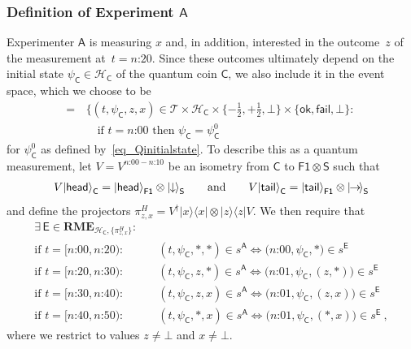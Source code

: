 \documentclass{article}
\theoremstyle{plain}
\theoremstyle{definition}
\newcommand*{\cH}{\mathcal{H}}
\newcommand*{\cT}{\mathcal{T}}
\newcommand*{\ket}[1]{{| #1 \rangle}}
\newcommand{\proj}[1]{|#1\rangle\!\langle #1|}
\newcommand*{\Exp}{\mathsf{E}}
\newcommand*{\Friendone}{\mathsf{F1}}
\newcommand*{\Assistant}{\mathsf{A}}
\newcommand*{\Spin}{\mathsf{S}}
\newcommand*{\Coin}{\mathsf{C}}
\newcommand*{\RME}{\mathbf{RME}}
\newcommand*{\spindown}{\ket{{\hspace{-0.1ex}\downarrow\hspace{-0.1ex}}}}
\newcommand*{\spinright}{\ket{{\hspace{-0.2ex}\rightarrow\hspace{-0.4ex}}}}
\newcommand*{\sminus}{{\textstyle - \frac{1}{2}}}
\newcommand*{\splus}{{\textstyle + \frac{1}{2}}}
\newcommand*{\ok}{\mathsf{ok}}
\newcommand*{\fail}{\mathsf{fail}}
\newcommand*{\head}{\mathsf{head}}
\newcommand*{\tail}{\mathsf{tail}}
\begin{document}
\subsubsection*{Definition of Experiment $\Assistant$}

Experimenter $\Assistant$ is measuring $x$ and, in addition, interested in the outcome~$z$ of the measurement at~$t = \text{$n$:20}$. Since these outcomes ultimately depend on the initial state $\psi_{\Coin} \in \cH_{\Coin}$ of the quantum coin $\Coin$, we also include it in the event space, which we choose to be
\begin{align}
    [\Assistant]  = \, & \bigl\{(t, \psi_{\Coin}, z, x) \in \cT \times \cH_\Coin\times \{\sminus, \splus, \bot\} \times \{\ok, \fail, \bot\} : \, \nonumber  \\ & \quad \text{if } t = \text{$n$:00} \text{ then } \psi_{\Coin} = \psi_{\Coin}^0  \label{eq_Assistantpsi} 
\end{align}
for $\psi^0_{\Coin}$ as defined by~\eqref{eq_Qinitialstate}. To describe this as a quantum measurement, let $V = V^{\text{$n$:00} - \text{$n$:10}}$ be an isometry from $\Coin$ to $\Friendone \otimes \Spin$  such that
\begin{align*}
  V \ket{\head}_\Coin =  \ket{\head}_{\Friendone} \otimes \spindown_{\Spin} \qquad \text{and} \qquad
  V\ket{\tail}_\Coin = \ket{\tail}_{\Friendone} \otimes \spinright_{\Spin} 
\end{align*}
and define the projectors $\pi^H_{z, x} = V^{\dagger} \proj{x} \otimes \proj{z} V$. We then require that
  \begin{align} \label{eq_AssistantM}
  \exists \,  \Exp \in \RME_{\cH_{\Coin}, \{\pi^H_{z,x}\}} : & \\
  \text{if $t = [\text{$n$:00}, \text{$n$:20}$)} : & \quad  (t, \psi_\Coin, *, *) \in s^{\Assistant} \iff \bigl(\text{$n$:00}, \psi_{\Coin}, * \bigr) \in s^{\Exp} \nonumber \\
    \text{if $t = [\text{$n$:20}, \text{$n$:30}$)} : & \quad  (t, \psi_\Coin, z, *) \in s^{\Assistant} \iff \bigl(\text{$n$:01}, \psi_{\Coin}, (z,*) \bigr) \in s^{\Exp}  \nonumber \\
    \text{if $t = [\text{$n$:30}, \text{$n$:40}$)} : & \quad  (t, \psi_\Coin, z, x) \in s^{\Assistant} \iff \bigl(\text{$n$:01}, \psi_{\Coin}, (z, x)\bigr) \in s^{\Exp} \nonumber \\
    \text{if $t = [\text{$n$:40}, \text{$n$:50}$)} : & \quad  (t, \psi_\Coin, *, x) \in s^{\Assistant} \iff \bigl(\text{$n$:01}, \psi_{\Coin}, (*, x)\bigr) \in s^{\Exp} \nonumber \ ,
\end{align}
 where we restrict to values $z \neq \bot$ and $x \neq \bot$.
\end{document}
